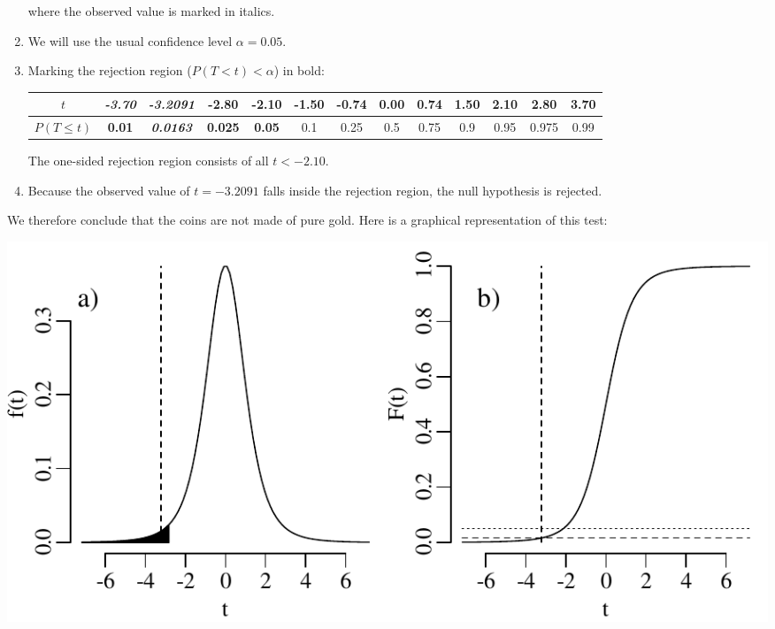 \begin{enumerate}
  \noindent where the observed value is marked in italics.
  
\item We will use the usual confidence level $\alpha = 0.05$.

\item Marking the rejection region ($P(T<t)<\alpha$) in bold:
  
  \begin{center}
    \begin{tabular}{c|c@{\gap}c@{\gap}c@{\gap}c@{\gap}
        c@{\gap}c@{\gap}c@{\gap}c@{\gap}c@{\gap}c@{\gap}c@{\gap}c}
      $t$ & \textbf{\textit{-3.70}} & \textbf{\emph{-3.2091}} & \textbf{-2.80} &
      \textbf{-2.10} & -1.50 & -0.74 & 0.00 & 0.74 & 1.50 & 2.10 & 2.80 & 3.70 \\ \hline
      $P(T\leq{t})$ & \textbf{0.01} & \textbf{\textit{0.0163}} & \textbf{0.025} &
      \textbf{0.05} & 0.1 & 0.25 & 0.5 & 0.75 & 0.9 &
      0.95 & 0.975 & 0.99
    \end{tabular}
  \end{center}

  The one-sided rejection region consists of all $t<-2.10$.

\item Because the observed value of $t=-3.2091$ falls inside the
  rejection region, the null hypothesis is rejected.

\end{enumerate}

We therefore conclude that the coins are not made of pure gold. Here
is a graphical representation of this test:

\noindent\begin{minipage}[t][][b]{.6\textwidth}
  \includegraphics[width=\textwidth]{../figures/1samplettest.pdf}\\
\end{minipage}
\begin{minipage}[t][][t]{.4\textwidth}
  \label{fig:1samplettest}
\end{minipage}

